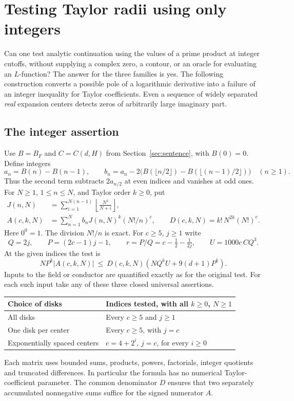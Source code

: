 \section{Testing Taylor radii using only integers}\label{sec:taylor}
Can one test analytic continuation using the values of a prime product at integer cutoffs, without supplying a complex zero, a contour, or an oracle for evaluating an $L$-function? The answer for the three families is yes. The following construction converts a possible pole of a logarithmic derivative into a failure of an integer inequality for Taylor coefficients. Even a sequence of widely separated \emph{real} expansion centers detects zeros of arbitrarily large imaginary part.

\subsection*{The integer assertion}
Use $B=B_F$ and $C=C(d,H)$ from Section~\ref{sec:sentence}, with $B(0)=0$. Define integers
\[
 a_n=B(n)-B(n-1),\qquad
 b_n=a_n-2\bigl(B(\lfloor n/2\rfloor)-B(\lfloor(n-1)/2\rfloor)\bigr)\quad(n\ge1).
\]
Thus the second term subtracts $2a_{n/2}$ at even indices and vanishes at odd ones. For $N\ge1$, $1\le n\le N$, and Taylor order $k\ge0$, put
\begin{align*}
 J(n,N)&=\sum_{i=1}^{N(n-1)}\left\lfloor\frac{N^2}{N+i}\right\rfloor,\\
 A(c,k,N)&=\sum_{n=1}^N b_n J(n,N)^k (N!/n)^c,\qquad
 D(c,k,N)=k!\,N^{2k}(N!)^c .
\end{align*}
Here $0^0=1$. The division $N!/n$ is exact. For $c\ge5$, $j\ge1$ write
\[
 Q=2j,\qquad P=(2c-1)j-1,\qquad
 r=P/Q=c-\tfrac12-\tfrac1{2j},\qquad U=1000c\,C Q^3.
\]
At the given indices the test is
\begin{equation}\label{eq:taylor-packet}
   N P^k |A(c,k,N)|\ \le\
   D(c,k,N)\left(N Q^k U+9(d+1)P^k\right).
\end{equation}
Inputs to the field or conductor are quantified exactly as for the original test. For each such input take any of these three closed universal assertions.
\begin{center}\small
\begin{tabular}{@{}ll@{}}\toprule
Choice of disks & Indices tested, with all $k\ge0$, $N\ge1$\\\midrule
All disks & Every $c\ge5$ and $j\ge1$\\
One disk per center & Every $c\ge5$, with $j=c$\\
Exponentially spaced centers & $c=4+2^i$, $j=c$, for every $i\ge0$\\\bottomrule
\end{tabular}
\end{center}
Each matrix uses bounded sums, products, powers, factorials, integer quotients and truncated differences. In particular the formula has no numerical Taylor-coefficient parameter. The common denominator $D$ ensures that two separately accumulated nonnegative sums suffice for the signed numerator $A$.

